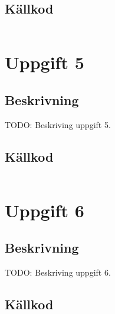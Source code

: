 \documentclass[11pt,a4paper]{article}
\begin{document}
\subsection{Källkod}\label{uppgift-4_src}
\inputminted[]{java}{../src/Lab1Uppg04.java}

\section{Uppgift 5}\label{uppgift-5}

\subsection{Beskrivning}
TODO: Beskriving uppgift 5.

\subsection{Källkod}\label{uppgift-5_src}
\inputminted[]{java}{../src/Lab1Uppg05.java}

\section{Uppgift 6}\label{uppgift-6}

\subsection{Beskrivning}
TODO: Beskriving uppgift 6.

\subsection{Källkod}\label{uppgift-6_src}
\inputminted[]{java}{../src/Lab1Uppg06.java}

\end{document}
